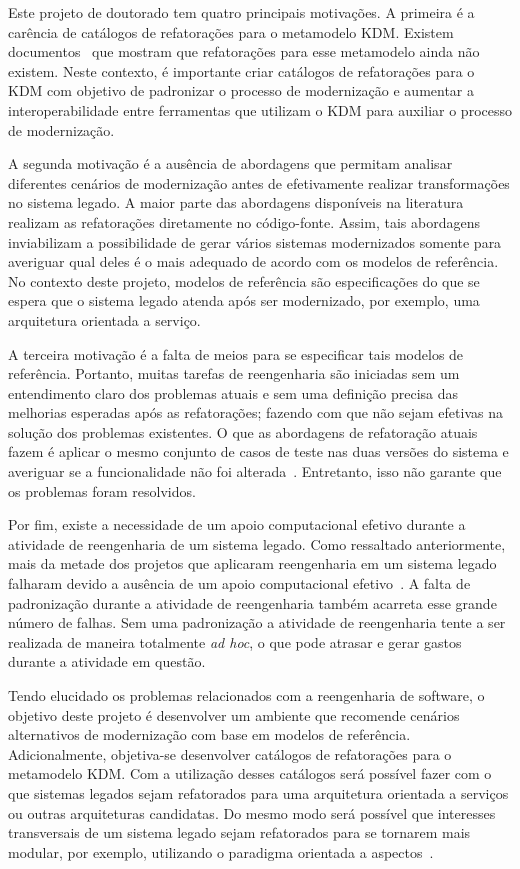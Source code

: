 Este projeto de doutorado tem quatro principais motivações. A primeira é a carência de catálogos de refatorações para o metamodelo KDM. Existem documentos~\cite{OMGADM, ADMBook, ADMCHAPTERR} que mostram que refatorações para esse metamodelo ainda não existem. Neste contexto, é importante criar catálogos de refatorações para o KDM com objetivo de padronizar o processo de modernização e aumentar a interoperabilidade entre ferramentas que utilizam o KDM para auxiliar o processo de modernização.


A segunda motivação é a ausência de abordagens que permitam analisar diferentes cenários de modernização antes de efetivamente realizar transformações no sistema legado. A maior parte das abordagens disponíveis na literatura realizam as refatorações diretamente no código-fonte. Assim, tais abordagens inviabilizam a possibilidade de gerar vários sistemas modernizados somente para averiguar qual deles é o mais adequado de acordo com os modelos de referência. No contexto deste projeto, modelos de referência são especificações do que se espera que o sistema legado atenda após ser modernizado, por exemplo, uma arquitetura orientada a serviço.


A terceira motivação é a falta de meios para se especificar tais modelos de referência. Portanto, muitas tarefas de reengenharia são iniciadas sem um entendimento claro dos problemas atuais e sem uma definição precisa das melhorias esperadas após as refatorações; fazendo com que não sejam efetivas na solução dos problemas existentes. O que as abordagens de refatoração atuais fazem é aplicar o mesmo conjunto de casos de teste nas duas versões do sistema e averiguar se a funcionalidade não foi alterada~\cite{Demeyer1, Demeyer2, RefactoringJava}. Entretanto, isso não garante que os problemas foram resolvidos.


Por fim, existe a necessidade de um apoio computacional efetivo durante a atividade de reengenharia de um sistema legado. Como ressaltado anteriormente, mais da metade dos projetos que aplicaram reengenharia em um sistema legado falharam devido a ausência de um apoio computacional efetivo~\cite{Sneed:2005}. A falta de padronização durante a atividade de reengenharia também acarreta esse grande número de falhas. Sem uma padronização a atividade de reengenharia tente a ser realizada de maneira totalmente \textit{ad hoc}, o que pode atrasar e gerar gastos durante a atividade em questão.


Tendo elucidado os problemas relacionados com a reengenharia de software, o objetivo deste projeto é desenvolver um ambiente que recomende cenários alternativos de modernização com base em modelos de referência. Adicionalmente, objetiva-se desenvolver catálogos de refatorações para o metamodelo KDM. Com a utilização desses catálogos será possível fazer com o que sistemas legados sejam refatorados para uma arquitetura orientada a serviços ou outras arquiteturas candidatas. Do mesmo modo será possível que interesses transversais de um sistema legado sejam refatorados para se tornarem mais modular, por exemplo, utilizando o paradigma orientada a aspectos~\cite{Kiczales}. 


